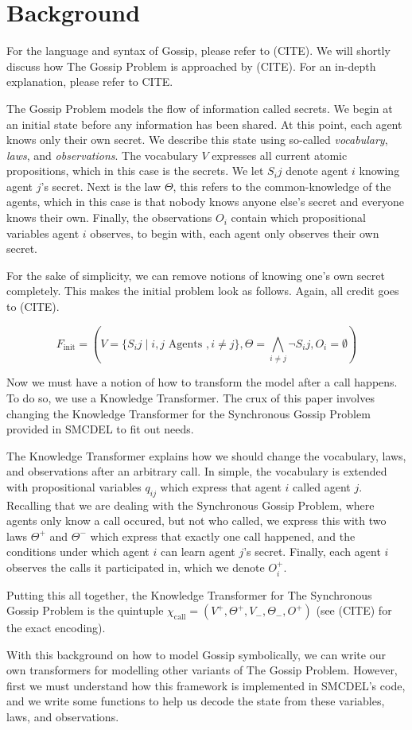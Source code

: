 \section{Background}

For the language and syntax of Gossip, please refer to (CITE). We will shortly discuss how The Gossip Problem is approached by (CITE). For an in-depth explanation, please refer to CITE.

The Gossip Problem models the flow of information called secrets. We begin at an initial state before any information has been shared. At this point, each agent knows only their own secret. We describe this state using so-called \textit{vocabulary}, \textit{laws}, and \textit{observations}. The vocabulary $V$ expresses all current atomic propositions, which in this case is the secrets. We let $S_ij$ denote agent $i$ knowing agent $j$'s secret. Next is the law $\Theta$, this refers to the common-knowledge of the agents, which in this case is that nobody knows anyone else's secret and everyone knows their own. Finally, the observations $O_i$ contain which propositional variables agent $i$ observes, to begin with, each agent only observes their own secret. 

For the sake of simplicity, we can remove notions of knowing one's own secret completely. This makes the initial problem look as follows. Again, all credit goes to (CITE).

$$F_\text{init} = (V = \{S_ij \mid i, j \text{ Agents }, i \neq j\}, \Theta =\bigwedge_{i\neq j} \lnot S_ij , O_i = \emptyset)$$ 

Now we must have a notion of how to transform the model after a call happens. To do so, we use a Knowledge Transformer. The crux of this paper involves changing the Knowledge Transformer for the Synchronous Gossip Problem provided in SMCDEL to fit out needs. 

The Knowledge Transformer explains how we should change the vocabulary, laws, and observations after an arbitrary call. In simple, the vocabulary is extended with propositional variables $q_{ij}$ which express that agent $i$ called agent $j$. Recalling that we are dealing with the Synchronous Gossip Problem, where agents only know a call occured, but not who called, we express this with two laws $\Theta^+$ and $\Theta^-$ which express that exactly one call happened, and the conditions under which agent $i$ can learn agent $j$'s secret. Finally, each agent $i$ observes the calls it participated in, which we denote $O^+_i$. 

Putting this all together, the Knowledge Transformer for The Synchronous Gossip Problem is the quintuple $\chi_\text{call}=(V^+,\Theta ^+,V_-,\Theta _-,O^+)$ (see (CITE) for the exact encoding).

With this background on how to model Gossip symbolically, we can write our own transformers for modelling other variants of The Gossip Problem. However, first we must understand how this framework is implemented in SMCDEL's code, and we write some functions to help us decode the state from these variables, laws, and observations.
